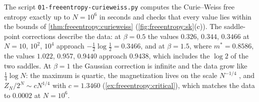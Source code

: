 \begin{refsection}
The script \texttt{01-freeentropy-curieweiss.py} computes the Curie--Weiss free entropy exactly up to $N=10^6$ in seconds and checks that every value lies within the bounds of \cref{thm:freeentropy:curieweiss} (\cref{fig:freeentropy:sk}(c)). The saddle-point corrections describe the data: at $\beta=0.5$ the values $0.326$, $0.344$, $0.3466$ at $N=10$, $10^2$, $10^4$ approach $-\frac12\log\frac12=0.3466$, and at $\beta=1.5$, where $m^*=0.8586$, the values $1.022$, $0.957$, $0.9440$ approach $0.9438$, which includes the $\log2$ of the two saddles. At $\beta=1$ the Gaussian correction is infinite and the data grow like $\frac14\log N$: the maximum is quartic, the magnetization lives on the scale $N^{-1/4}$ \parencite{EllisNewman1978}, and $Z_N/2^N\sim cN^{1/4}$ with $c=1.3460$ (\cref{ex:freeentropy:critical}), which matches the data to $0.0002$ at $N=10^6$.


\end{refsection}
